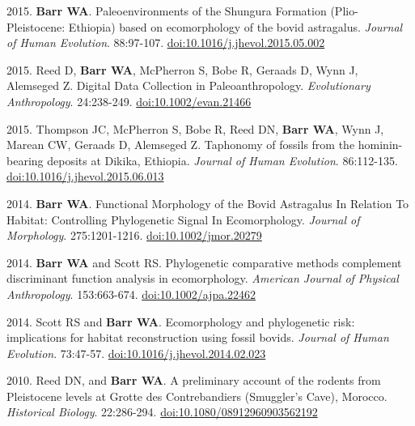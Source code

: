 \begin{etaremune}
\item  2015. {\bfseries Barr WA}. Paleoenvironments of the Shungura Formation (Plio-Pleistocene: Ethiopia) based on ecomorphology of the bovid astragalus. \emph{Journal of Human Evolution}. 88:97-107. \href{http://dx.doi.org/10.1016/j.jhevol.2015.05.002}{doi:10.1016/j.jhevol.2015.05.002}

\item  2015. Reed D, {\bfseries Barr WA}, McPherron S, Bobe R, Geraads D, Wynn J, Alemseged Z. Digital Data Collection in Paleoanthropology. \emph{Evolutionary Anthropology}. 24:238-249. \href{http://dx.doi.org/10.1002/evan.21466}{doi:10.1002/evan.21466}

\item  2015. Thompson JC, McPherron S, Bobe R, Reed DN, {\bfseries Barr WA}, Wynn J, Marean CW, Geraads D, Alemseged Z. Taphonomy of fossils from the hominin-bearing deposits at Dikika, Ethiopia. \emph{Journal of Human Evolution}. 86:112-135. \href{http://dx.doi.org/10.1016/j.jhevol.2015.06.013}{doi:10.1016/j.jhevol.2015.06.013}



\item  2014. {\bfseries Barr WA}. Functional Morphology of the Bovid Astragalus In Relation To Habitat: Controlling Phylogenetic Signal In Ecomorphology. \emph{Journal of Morphology}. 275:1201-1216. \href{http://dx.doi.org/10.1002/jmor.20279}{doi:10.1002/jmor.20279}

\item  2014. {\bfseries Barr WA} and Scott RS. Phylogenetic comparative methods complement discriminant function analysis in ecomorphology. \emph{American Journal of Physical Anthropology}. 153:663-674. \href{http://dx.doi.org/10.1002/ajpa.22462}{doi:10.1002/ajpa.22462}

\item  2014. Scott RS and {\bfseries Barr WA}. Ecomorphology and phylogenetic risk: implications for habitat reconstruction using fossil bovids. \emph{Journal of Human Evolution}. 73:47-57. \href{http://dx.doi.org/10.1016/j.jhevol.2014.02.023}{doi:10.1016/j.jhevol.2014.02.023}


\item  2010. Reed DN, and {\bfseries Barr WA}. A preliminary account of the rodents from Pleistocene levels at Grotte des Contrebandiers (Smuggler's Cave), Morocco. \emph{Historical Biology}. 22:286-294. \href{http://dx.doi.org/10.1080/08912960903562192}{doi:10.1080/08912960903562192}

\end{etaremune}

